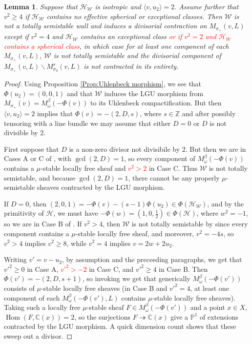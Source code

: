 \documentclass[leqno,11pt]{amsart}
\def\C{\ensuremath{\mathbb{C}}}
\def\P{\ensuremath{\mathbb{P}}}
\def\Z{\ensuremath{\mathbb{Z}}}
\def\Hom{\mathop{\mathrm{Hom}}\nolimits}
\def\onto{\ensuremath{\twoheadrightarrow}}
\newtheorem{Lem}[Thm]{Lemma}
\theoremstyle{definition}
\def\C{\ensuremath{\mathbb{C}}}
\def\P{\ensuremath{\mathbb{P}}}
\def\Z{\ensuremath{\mathbb{Z}}}
\def\HH{\ensuremath{\mathcal H}}
\def\WW{\ensuremath{\mathcal W}}
\begin{document}
\begin{Lem}\label{Lem: isotropic divisorial l=2 1}
Suppose that $\HH_{\WW}$ is isotropic and $\langle v,u_2\rangle=2$.  Assume further that $v^2\geq 4$ if $\HH_{\WW}$ contains no effective spherical or exceptional classes.  Then $\WW$ is not a totally semistable wall and induces a divisorial contraction on $M_{\sigma_+}(v,L)$ except if $v^2=4$ and $\HH_{\WW}$ contains an exceptional class \textcolor{red}{ or if $v^2=2$ and $\HH_W$
contains a spherical class}, in which case for at least one component of each $M_{\sigma_+}(v,L)$, $\WW$ is not totally semistable and the divisorial component of $M_{\sigma_+}(v,L)\backslash M^s_{\sigma_0}(v,L)$ is not contracted in its entirety.
\end{Lem}
\begin{proof}
Using Proposition \ref{Prop:Uhlenbeck morphism}, we see that $\Phi(u_2)=(0,0,1)$ and that $\WW$ induces the LGU morphism from $M_{\sigma_+}(v)=M_{\omega}^{\beta}(-\Phi(v))$ to its Uhlenbeck compactification.  But then $\langle v,u_2\rangle=2$ implies that $\Phi(v)=-(2,D,s)$, where $s\in\Z$ and after possibly tensoring with a line bundle we may assume that either $D=0$ or $D$ is not divisible by 2.  

First suppose that $D$ is a non-zero divisor not divisibile by 2.  But then we are in Cases A or C of \cite[Theorem 2.1]{Yos16a}, with $\gcd(2,D)=1$, so every component of $M_{\omega}^{\beta}(-\Phi(v))$ contains a $\mu$-stable locally free sheaf and \textcolor{red}{$v^2> 2$} in Case C.  Thus $\WW$ is not totally semistable, and because $\gcd(2,D)=1$, there cannot be any properly $\mu$-semistable sheaves contracted by the LGU morphism. 

If $D=0$, then $(2,0,1)=-\Phi(v)-(s-1)\Phi(u_2)\in\Phi(\HH_{\WW})$, and by the primitivity of $\HH$, we must have $-\Phi(w)=(1,0,\frac{1}{2})\in\Phi(\HH)$, where $w^2=-1$, so we are in Case B of \cite[Theorem 2.1]{Yos16a}.  If $v^2>4$, then $\WW$ is not totally semistable by \cite[Lemma 2.8 (2)]{Yos16a} since every component contains a $\mu$-stable locally free sheaf, and moreover, $v^2=-4s$, so $v^2>4$ implies $v^2\geq 8$, while $v^2=4$ implies $v=2w+2u_2$.

Writing $v'=v-u_2$, by assumption and the preceeding paragraphs, we get that $v'^2\geq 0$ in Case A, \textcolor{red}{$v'^2> -2$} in Case C, and $v'^2\geq 4$ in Case B.  Then $\Phi(v')=-(2,D,s+1)$, so invoking \cite[Theorem 2.1]{Yos16a} we get that generically $M_{\omega}^{\beta}(-\Phi(v'))$ consists of $\mu$-stable locally free sheaves (in Case B and $v'^2=4$, at least one component of each $M_{\omega}^{\beta}(-\Phi(v'),L)$ contains $\mu$-stable locally free sheaves).  Taking such a locally free $\mu$-stable sheaf $F\in M_{\omega}^{\beta}(-\Phi(v'))$ and a point $x\in X$, $\Hom(F,\C(x))=2$, so the surjections $F\onto\C(x)$ give a $\P^1$ of extensions contracted by the LGU morphism.  A quick dimension count shows that these sweep out a divisor.


\end{proof}
\end{document}
